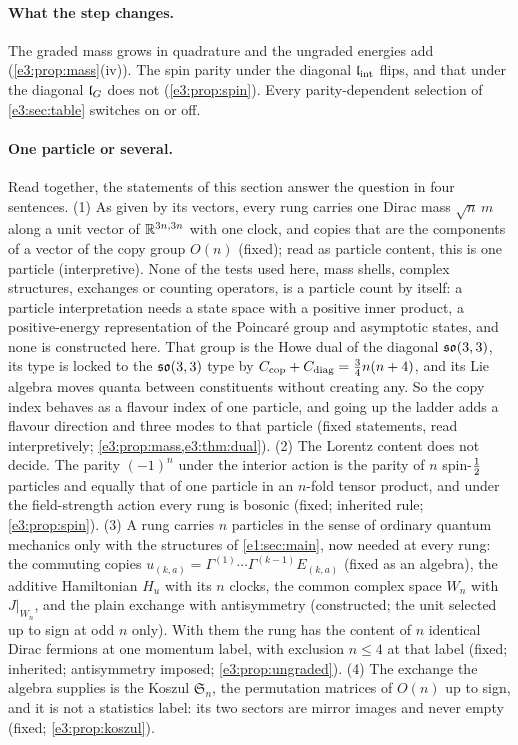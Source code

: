 \paragraph{What the step changes.} The graded mass grows in quadrature and the ungraded energies add (\cref{e3:prop:mass}(iv)). The spin parity
under the diagonal $\mathfrak l_{\rm int}$ flips, and that under the diagonal $\mathfrak l_G$ does not (\cref{e3:prop:spin}). Every parity-dependent selection of
\cref{e3:sec:table} switches on or off.

\paragraph{One particle or several.} Read together, the statements of this section answer the question in four sentences. (1) As given by
its vectors, every rung carries one Dirac mass $\sqrt n\,m$ along a unit vector of $\mathbb{R}^{3n,3n}$ with one clock, and copies that are the
components of a vector of the copy group $O(n)$ (fixed); read as particle content, this is one particle (interpretive). None of the tests
used here, mass shells, complex structures, exchanges or counting operators, is a particle count by itself: a particle interpretation needs a
state space with a positive inner product, a positive-energy representation of the Poincar\'e group and asymptotic states, and none is
constructed here. That group is the Howe dual of the diagonal $\mathfrak{so}(3,3)$, its type is locked to
the $\mathfrak{so}(3,3)$ type by $C_{\rm cop}+C_{\rm diag}=\tfrac34n(n+4)$, and its Lie algebra moves quanta between constituents without creating any. So
the copy index behaves as a flavour index of one particle, and going up the ladder adds a flavour direction and three modes to that particle
(fixed statements, read interpretively; \cref{e3:prop:mass,e3:thm:dual}). (2) The Lorentz content does not decide. The parity $(-1)^n$ under
the interior action is the parity of $n$ spin-$\tfrac12$ particles and equally that of one particle in an $n$-fold tensor product, and under
the field-strength action every rung is bosonic (fixed; inherited rule; \cref{e3:prop:spin}). (3) A rung carries $n$ particles in the sense of
ordinary quantum mechanics only with the structures of \cref{e1:sec:main}, now needed at every rung: the commuting copies
$u_{(k,a)}=\Gamma^{(1)}\cdots\Gamma^{(k-1)}E_{(k,a)}$ (fixed as an algebra), the additive Hamiltonian $H_u$ with its $n$ clocks, the common complex
space $W_n$ with $J|_{W_n}$, and the plain exchange with antisymmetry (constructed; the unit selected up to sign at odd $n$ only). With them
the rung has the content of $n$ identical Dirac fermions at one momentum label, with exclusion $n\le4$ at that label (fixed; inherited;
antisymmetry imposed; \cref{e3:prop:ungraded}). (4) The
exchange the algebra supplies is the Koszul $\mathfrak S_n$, the permutation matrices of $O(n)$ up to sign, and it is not a statistics label: its
two sectors are mirror images and never empty (fixed; \cref{e3:prop:koszul}).

